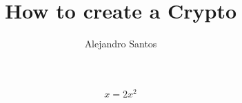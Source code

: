 \documentclass[12pt, oneside]{article}
\title{How to create a Crypto}
\author{Alejandro Santos}
\begin{document}
\maketitle

\begin{equation}
x=2x^2
\end{equation}
\end{document}
